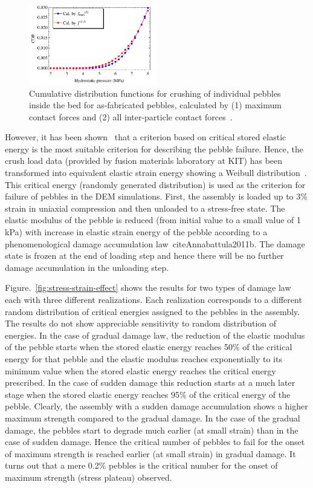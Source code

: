 \begin{figure}[!ht]
  \begin{center}
\includegraphics[width=0.5\textwidth]{chapters/figures/Fig-4}
\end{center}
 \caption{Cumulative distribution functions for crushing of individual pebbles inside the bed for as-fabricated pebbles, calculated by (1) maximum contact forces and (2) all inter-particle contact forces~\cite{Gan:2010kc}.}
 \label{fig:cdf_pebbles}
\end{figure}

However, it has been shown~\cite{Zhao2010,Zhao2011} that a criterion based on critical stored elastic energy is the most suitable criterion for describing the \lis pebble failure. Hence, the crush load data (provided by fusion materials laboratory at KIT) has been transformed into equivalent elastic strain energy showing a Weibull distribution~\cite{Zhao2010}. This critical energy (randomly generated distribution) is used as the criterion for failure of pebbles in the DEM simulations. First, the assembly is loaded up to 3\% strain in uniaxial compression and then unloaded to a stress-free state. The elastic modulus of the pebble is reduced (from initial value to a small value of 1 kPa) with increase in elastic strain energy of the pebble according to a phenomenological damage accumulation law~cite{Annabattula2011b}. The damage state is frozen at the end of loading step and hence there will be no further damage accumulation in the unloading step. 

Figure.~\ref{fig:stress-strain-effect} shows the results for two types of damage law each with three different realizations. Each realization corresponds to a different random distribution of critical energies assigned to the pebbles in the assembly. The results do not show appreciable sensitivity to random distribution of energies. In the case of gradual damage law, the reduction of the elastic modulus of the pebble starts when the stored elastic energy reaches 50\% of the critical energy for that pebble and the elastic modulus reaches exponentially to its minimum value when the stored elastic energy reaches the critical energy prescribed. In the case of sudden damage this reduction starts at a much later stage when the stored elastic energy reaches 95\% of the critical energy of the pebble. Clearly, the assembly with a sudden damage accumulation shows a higher maximum strength compared to the gradual damage. In the case of the gradual damage, the pebbles start to degrade much earlier (at small strain) than in the case of sudden damage. Hence the critical number of pebbles to fail for the onset of maximum strength is reached earlier (at small strain) in gradual damage. It turns out that a mere 0.2\% pebbles is the critical number for the onset of maximum strength (stress plateau) observed.


